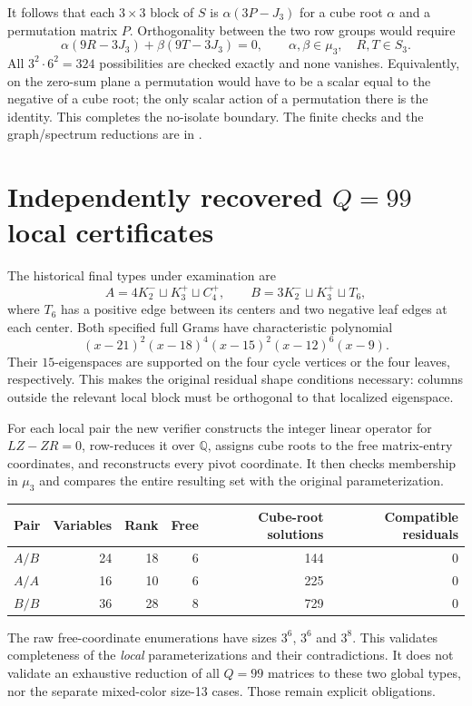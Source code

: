 \documentclass[11pt,a4paper]{article}
\newcommand{\muT}{\mu_3}\newcommand{\B}{B}\newcommand{\HH}{H^{*}}\newcommand{\QQ}{\mathbb Q}\newcommand{\ZZ}{\mathbb Z}\newcommand{\tr}{\operatorname{tr}}\newcommand{\diag}{\operatorname{diag}}\newcommand{\spec}{\operatorname{spec}}
\newcommand{\file}[1]{\path{#1}}
\begin{document}
It follows that each $3\times3$ block of $S$ is $\alpha(3P-J_3)$ for a cube root $\alpha$ and a permutation matrix $P$. Orthogonality between the two row groups would require
\[
 \alpha(9R-3J_3)+\beta(9T-3J_3)=0,
 \qquad \alpha,\beta\in\muT,\quad R,T\in S_3.
\]
All $3^2\cdot6^2=324$ possibilities are checked exactly and none vanishes. Equivalently, on the zero-sum plane a permutation would have to be a scalar equal to the negative of a cube root; the only scalar action of a permutation there is the identity. This completes the no-isolate boundary. The finite checks and the graph/spectrum reductions are in \file{programs/verify_q81.py}.

\section{Independently recovered $Q=99$ local certificates}
The historical final types under examination are
\[
 A=4K_2^-\sqcup K_3^+\sqcup C_4^+,
 \qquad B=3K_2^-\sqcup K_3^+\sqcup T_6,
\]
where $T_6$ has a positive edge between its centers and two negative leaf edges at each center. Both specified full Grams have characteristic polynomial
\[
 (x-21)^2(x-18)^4(x-15)^2(x-12)^6(x-9).
\]
Their $15$-eigenspaces are supported on the four cycle vertices or the four leaves, respectively. This makes the original residual shape conditions necessary: columns outside the relevant local block must be orthogonal to that localized eigenspace.

For each local pair the new verifier constructs the integer linear operator for $LZ-ZR=0$, row-reduces it over $\QQ$, assigns cube roots to the free matrix-entry coordinates, and reconstructs every pivot coordinate. It then checks membership in $\muT$ and compares the entire resulting set with the original parameterization.
\begin{center}
\begin{tabular}{lrrrrr}\toprule
Pair & Variables & Rank & Free & Cube-root solutions & Compatible residuals\\\midrule
$A/B$ &24&18&6&144&0\\
$A/A$ &16&10&6&225&0\\
$B/B$ &36&28&8&729&0\\\bottomrule
\end{tabular}
\end{center}
The raw free-coordinate enumerations have sizes $3^6$, $3^6$ and $3^8$. This validates completeness of the \emph{local} parameterizations and their contradictions. It does not validate an exhaustive reduction of all $Q=99$ matrices to these two global types, nor the separate mixed-color size-13 cases. Those remain explicit obligations.
\end{document}
